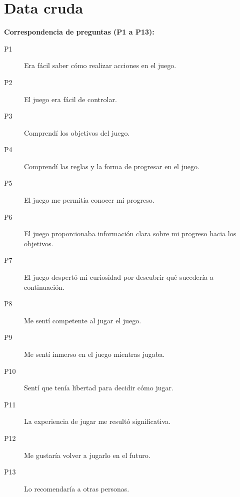\section{Data cruda}
\small
\noindent\textbf{Correspondencia de preguntas (P1 a P13):}
\begin{description}
\item[P1] Era fácil saber cómo realizar acciones en el juego.
\item[P2] El juego era fácil de controlar.
\item[P3] Comprendí los objetivos del juego.
\item[P4] Comprendí las reglas y la forma de progresar en el juego.
\item[P5] El juego me permitía conocer mi progreso.
\item[P6] El juego proporcionaba información clara sobre mi progreso hacia los objetivos.
\item[P7] El juego despertó mi curiosidad por descubrir qué sucedería a continuación.
\item[P8] Me sentí competente al jugar el juego.
\item[P9] Me sentí inmerso en el juego mientras jugaba.
\item[P10] Sentí que tenía libertad para decidir cómo jugar.
\item[P11] La experiencia de jugar me resultó significativa.
\item[P12] Me gustaría volver a jugarlo en el futuro.
\item[P13] Lo recomendaría a otras personas.
\end{description}

\clearpage

